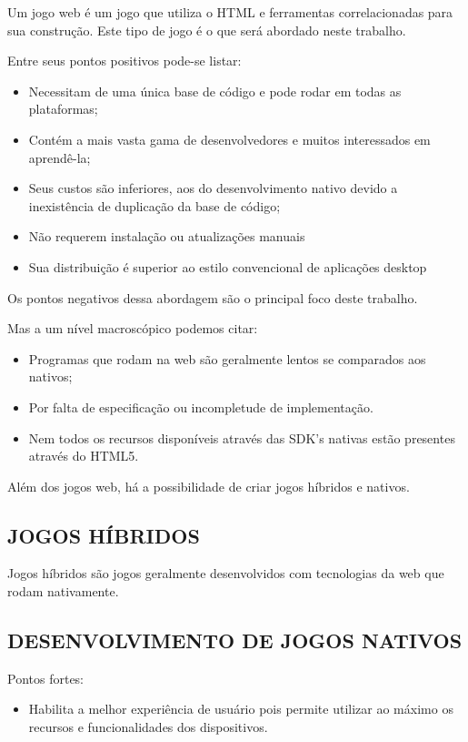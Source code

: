 Um jogo web é um jogo que utiliza o HTML e
ferramentas correlacionadas para sua construção. Este tipo de jogo
é o que será abordado neste trabalho.

Entre seus pontos positivos pode-se listar:

\begin{itemize}
\item Necessitam de uma única base de código e pode rodar em todas as
plataformas;
\item Contém a mais vasta gama de desenvolvedores e muitos
interessados em aprendê-la;
\item Seus custos são inferiores, aos do desenvolvimento nativo devido a 
inexistência de duplicação da base de código;
\item  Não requerem instalação ou atualizações manuais
\item  Sua distribuição é superior ao estilo convencional de aplicações desktop\autocite{browserGamesTechnologyAndFuture}
\end{itemize}

Os pontos negativos dessa abordagem são o principal foco deste trabalho.

Mas a um nível macroscópico podemos citar:
\begin{itemize}
\item Programas que rodam na web são geralmente lentos se comparados aos
nativos;
\item Por falta de especificação ou incompletude de implementação.
\item Nem todos os recursos disponíveis através das SDK's nativas estão presentes através do HTML5.
\end{itemize}

Além dos jogos web, há a possibilidade de criar jogos híbridos e nativos.

\subsection{JOGOS HÍBRIDOS}

Jogos híbridos são jogos geralmente desenvolvidos com tecnologias da
web que rodam nativamente.

\subsection{DESENVOLVIMENTO DE JOGOS NATIVOS}

Pontos fortes:
\begin{itemize}
\item Habilita a melhor experiência de usuário pois permite utilizar ao
máximo os recursos e funcionalidades dos dispositivos.
\end{itemize}

